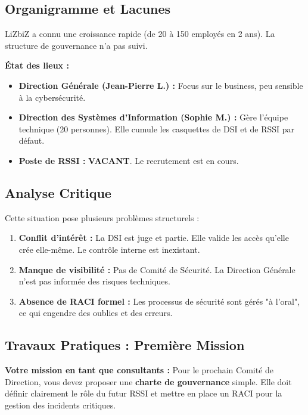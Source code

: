 \subsection{Organigramme et Lacunes}

LiZbiZ a connu une croissance rapide (de 20 à 150 employés en 2 ans). La structure de gouvernance n'a pas suivi.

\textbf{État des lieux :}
\begin{itemize}
    \item \textbf{Direction Générale (Jean-Pierre L.) :} Focus sur le business, peu sensible à la cybersécurité.
    \item \textbf{Direction des Systèmes d'Information (Sophie M.) :} Gère l'équipe technique (20 personnes). Elle cumule les casquettes de DSI et de RSSI par défaut.
    \item \textbf{Poste de RSSI :} \textbf{VACANT}. Le recrutement est en cours.
\end{itemize}

\subsection{Analyse Critique}

Cette situation pose plusieurs problèmes structurels :

\begin{enumerate}
    \item \textbf{Conflit d'intérêt :} La DSI est juge et partie. Elle valide les accès qu'elle crée elle-même. Le contrôle interne est inexistant.
    \item \textbf{Manque de visibilité :} Pas de Comité de Sécurité. La Direction Générale n'est pas informée des risques techniques.
    \item \textbf{Absence de RACI formel :} Les processus de sécurité sont gérés "à l'oral", ce qui engendre des oublies et des erreurs.
\end{enumerate}

\subsection{Travaux Pratiques : Première Mission}

\begin{boxlizbiz}
\textbf{Votre mission en tant que consultants :}
Pour le prochain Comité de Direction, vous devez proposer une \textbf{charte de gouvernance} simple. Elle doit définir clairement le rôle du futur RSSI et mettre en place un RACI pour la gestion des incidents critiques.
\end{boxlizbiz}


